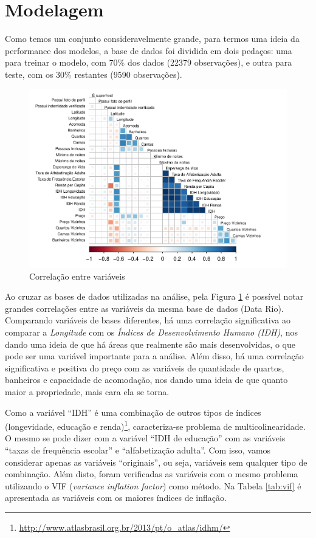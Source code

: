 \documentclass[
	12pt,				%
	a4paper,		%
	oneside,    %
	chapter=TITLE,		   %
	section=TITLE,		   %
	subsection=TITLE,	   %
	subsubsection=TITLE, %
	english,			%
	french,				%
	spanish,			%
	brazil,				%
]{abntex2}
\begin{document}
\hypertarget{modelagem}{%
\section{Modelagem}\label{modelagem}}

Como temos um conjunto consideravelmente grande, para termos uma ideia
da performance dos modelos, a base de dados foi dividida em dois
pedaços: uma para treinar o modelo, com 70\% dos dados (22379
observações), e outra para teste, com os 30\% restantes (9590
observações).

\begin{figure}
\centering
\includegraphics{00-TCC_files/figure-latex/correlacao_variaveis-1.pdf}
\caption{\label{correlacao_variaveis}Correlação entre variáveis}
\end{figure}

Ao cruzar as bases de dados utilizadas na análise, pela Figura
\ref{correlacao_variaveis} é possível notar grandes correlações entre as
variáveis da mesma base de dados (Data Rio). Comparando variáveis de
bases diferentes, há uma correlação significativa ao comparar a
\emph{Longitude} com os \emph{Índices de Desenvolvimento Humano (IDH)},
nos dando uma ideia de que há áreas que realmente são mais
desenvolvidas, o que pode ser uma variável importante para a análise.
Além disso, há uma correlação significativa e positiva do preço com as
variáveis de quantidade de quartos, banheiros e capacidade de
acomodação, nos dando uma ideia de que quanto maior a propriedade, mais
cara ela se torna.

Como a variável ``IDH'' é uma combinação de outros tipos de índices
(longevidade, educação e renda)\footnote{\url{http://www.atlasbrasil.org.br/2013/pt/o_atlas/idhm/}},
caracteriza-se problema de multicolinearidade. O mesmo se pode dizer com
a variável ``IDH de educação'' com as variáveis ``taxas de frequência
escolar'' e ``alfabetização adulta''. Com isso, vamos considerar apenas
as variáveis ``originais'', ou seja, variáveis sem qualquer tipo de
combinação. Além disto, foram verificadas as variáveis com o mesmo
problema utilizando o VIF (\emph{variance inflation factor}) como
método. Na Tabela \ref{tab:vif} é apresentada as variáveis com os
maiores índices de inflação.
\end{document}
